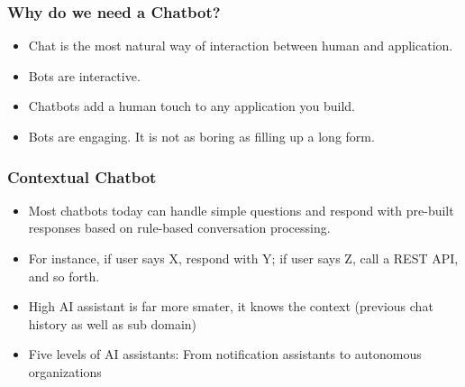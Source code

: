 \begin{frame}[fragile]\frametitle{Why do we need a Chatbot?}

\begin{itemize}
\item Chat is the most natural way of interaction between human and application.
\item Bots are interactive.
\item Chatbots add a human touch to any application you build.
\item Bots are engaging. It is not as boring as filling up a long form.
\end{itemize}

\end{frame}

\begin{frame}[fragile]\frametitle{Contextual Chatbot}

\begin{itemize}
\item Most chatbots today can handle simple questions and respond with pre-built responses based on rule-based conversation processing. 
\item For instance, if user says X, respond with Y; if user says Z, call a REST API, and so forth. 
\item High AI assistant is far more smater, it knows the context (previous chat history as well as sub domain)
\item Five levels of AI assistants: From notification assistants to autonomous organizations

\end{itemize}

\end{frame}




